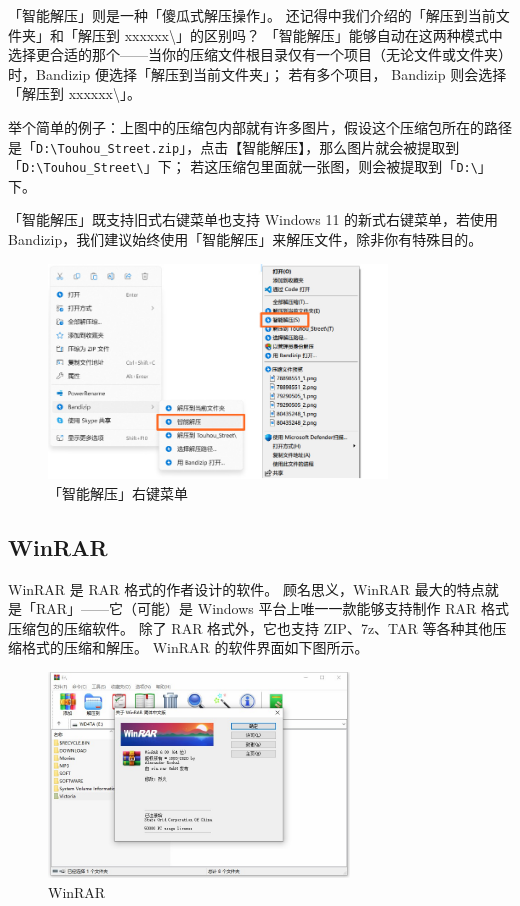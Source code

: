 「智能解压」则是一种「傻瓜式解压操作」。
还记得中我们介绍的「解压到当前文件夹」和「解压到 xxxxxx\textbackslash 」的区别吗？
「智能解压」能够自动在这两种模式中选择更合适的那个——当你的压缩文件根目录仅有一个项目（无论文件或文件夹）时，Bandizip 便选择「解压到当前文件夹」；
若有多个项目， Bandizip 则会选择「解压到 xxxxxx\textbackslash」。

举个简单的例子：上图中的压缩包内部就有许多图片，假设这个压缩包所在的路径是「\verb|D:\Touhou_Street.zip|」，点击【智能解压】，那么图片就会被提取到「\verb|D:\Touhou_Street\|」下；
若这压缩包里面就一张图，则会被提取到「\verb|D:\|」下。

「智能解压」既支持旧式右键菜单也支持 Windows 11 的新式右键菜单，若使用 Bandizip，我们建议始终使用「智能解压」来解压文件，除非你有特殊目的。

\begin{figure}[htb!]
  \centering
  \includegraphics[width=9cm]{assets/Smart_Extract.jpg}
  \caption{「智能解压」右键菜单}
  \label{Smart_Extract}
\end{figure}

\subsection{WinRAR}

WinRAR 是 RAR 格式的作者设计的软件。
顾名思义，WinRAR 最大的特点就是「RAR」——它（可能）是 Windows 平台上唯一一款能够支持制作 RAR 格式压缩包的压缩软件。
除了 RAR 格式外，它也支持 ZIP、7z、TAR 等各种其他压缩格式的压缩和解压。
WinRAR 的软件界面如下图所示。

\begin{figure}[htb!]
  \centering
  \includegraphics[width=8cm]{assets/WinRAR.jpg}
  \caption{WinRAR}
  \label{WinRAR}
\end{figure}

